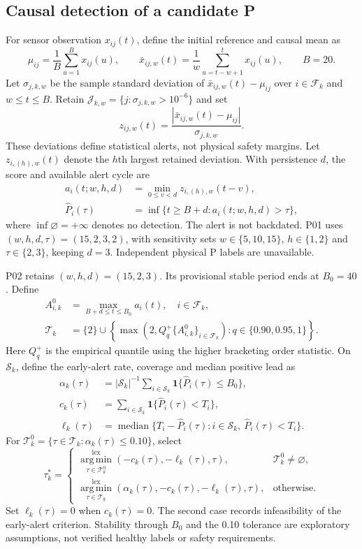 \documentclass[12pt]{article}
\begin{document}
\subsection{Causal detection of a candidate P}

For sensor observation $x_{ij}(t)$, define the initial reference and causal mean as
\[
\mu_{ij}=\frac{1}{B}\sum_{u=1}^{B}x_{ij}(u),\qquad
\bar x_{ij,w}(t)=\frac{1}{w}\sum_{u=t-w+1}^{t}x_{ij}(u),\qquad B=20.
\]
Let $\sigma_{j,k,w}$ be the sample standard deviation of $\bar x_{ij,w}(t)-\mu_{ij}$ over $i\in\mathcal F_k$ and $w\leq t\leq B$. Retain $\mathcal J_{k,w}=\{j:\sigma_{j,k,w}>10^{-6}\}$ and set
\[
z_{ij,w}(t)=\frac{|\bar x_{ij,w}(t)-\mu_{ij}|}{\sigma_{j,k,w}}.
\]
These deviations define statistical alerts, not physical safety margins. Let $z_{i,(h),w}(t)$ denote the $h$th largest retained deviation. With persistence $d$, the score and available alert cycle are
\[
\begin{aligned}
a_i(t;w,h,d)&=\min_{0\leq v<d}z_{i,(h),w}(t-v),\\
\widehat P_i(\tau)&=\inf\{t\geq B+d:a_i(t;w,h,d)>\tau\},
\end{aligned}
\]
where $\inf\varnothing=+\infty$ denotes no detection. The alert is not backdated. P01 uses $(w,h,d,\tau)=(15,2,3,2)$, with sensitivity sets $w\in\{5,10,15\}$, $h\in\{1,2\}$ and $\tau\in\{2,3\}$, keeping $d=3$. Independent physical P labels are unavailable.

P02 retains $(w,h,d)=(15,2,3)$. Its provisional stable period ends at $B_0=40$. Define
\[
\begin{aligned}
A_{i,k}^{0}&=\max_{B+d\leq t\leq B_0}a_i(t),\quad i\in\mathcal F_k,\\
\mathcal T_k&=\{2\}\cup
\left\{\max\!\left(2,Q_q^{+}\{A_{i,k}^{0}\}_{i\in\mathcal F_k}\right):
q\in\{0.90,0.95,1\}\right\}.
\end{aligned}
\]
Here $Q_q^{+}$ is the empirical quantile using the higher bracketing order statistic. On $\mathcal S_k$, define the early-alert rate, coverage and median positive lead as
\[
\begin{split}
\alpha_k(\tau)&=|\mathcal S_k|^{-1}\sum_{i\in\mathcal S_k}\mathbf1\{\widehat P_i(\tau)\leq B_0\},\\
c_k(\tau)&=\sum_{i\in\mathcal S_k}\mathbf1\{\widehat P_i(\tau)<T_i\},\\
\ell_k(\tau)&=\operatorname{median}\{T_i-\widehat P_i(\tau):i\in\mathcal S_k,\ \widehat P_i(\tau)<T_i\}.
\end{split}
\]
For $\mathcal T_k^{0}=\{\tau\in\mathcal T_k:\alpha_k(\tau)\leq0.10\}$, select
\[
\tau_k^*=\begin{cases}
\operatorname*{arg\,min}_{\tau\in\mathcal T_k^{0}}^{\mathrm{lex}}
(-c_k(\tau),-\ell_k(\tau),\tau),&\mathcal T_k^{0}\ne\varnothing,\\
\operatorname*{arg\,min}_{\tau\in\mathcal T_k}^{\mathrm{lex}}
(\alpha_k(\tau),-c_k(\tau),-\ell_k(\tau),\tau),&\text{otherwise}.
\end{cases}
\]
Set $\ell_k(\tau)=0$ when $c_k(\tau)=0$. The second case records infeasibility of the early-alert criterion. Stability through $B_0$ and the 0.10 tolerance are exploratory assumptions, not verified healthy labels or safety requirements.
\end{document}
